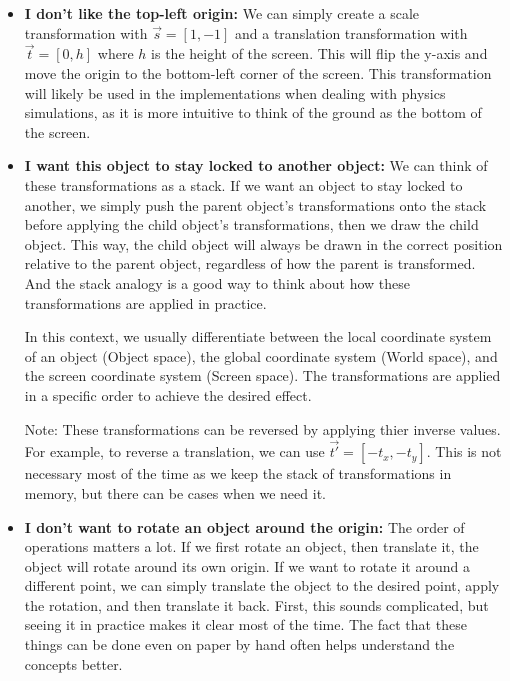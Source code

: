 \begin{itemize}
    \item \textbf{I don't like the top-left origin: } We can simply create a scale transformation with \(\vec{s} = [1, -1]\) and a translation transformation with \(\vec{t} = [0, h]\) where \(h\) is the height of the screen. This will flip the y-axis and move the origin to the bottom-left corner of the screen. This transformation will likely be used in the implementations when dealing with physics simulations, as it is more intuitive to think of the ground as the bottom of the screen.

    \item \textbf{I want this object to stay locked to another object: } We can think of these transformations as a stack. If we want an object to stay locked to another, we simply push the parent object's transformations onto the stack before applying the child object's transformations, then we draw the child object. This way, the child object will always be drawn in the correct position relative to the parent object, regardless of how the parent is transformed. And the stack analogy is a good way to think about how these transformations are applied in practice. 

    In this context, we usually differentiate between the local coordinate system of an object (Object space), the global coordinate system (World space), and the screen coordinate system (Screen space). The transformations are applied in a specific order to achieve the desired effect.

    Note: These transformations can be reversed by applying thier inverse values. For example, to reverse a translation, we can use \(\vec{t'} = [-t_x, -t_y]\). This is not necessary most of the time as we keep the stack of transformations in memory, but there can be cases when we need it.

    \item \textbf{I don't want to rotate an object around the origin: } The order of operations matters a lot. If we first rotate an object, then translate it, the object will rotate around its own origin. If we want to rotate it around a different point, we can simply translate the object to the desired point, apply the rotation, and then translate it back. First, this sounds complicated, but seeing it in practice makes it clear most of the time. The fact that these things can be done even on paper by hand often helps understand the concepts better.
\end{itemize}

